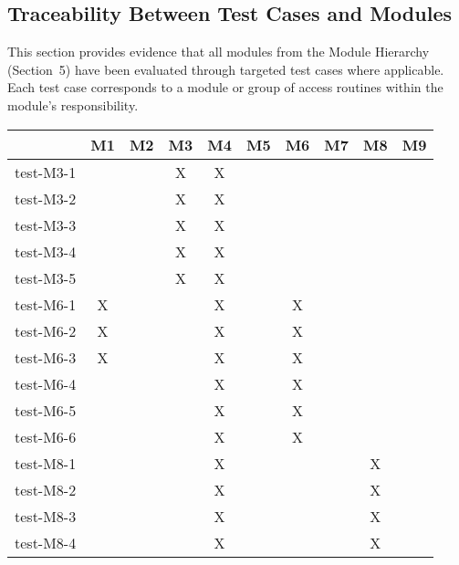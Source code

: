 \documentclass[12pt, titlepage]{article}
\begin{document}
\subsection{Traceability Between Test Cases and Modules}
\label{sec:trace-test-modules}

This section provides evidence that all modules from the Module Hierarchy (Section~5) have been evaluated through targeted test cases where applicable. Each test case corresponds to a module or group of access routines within the module's responsibility.

\begin{table}[h!]
  \centering
  \begin{tabular}{|c|c|c|c|c|c|c|c|c|c|}
  \hline
   & M1 & M2 & M3 & M4 & M5 & M6 & M7 & M8 & M9 \\
  \hline
  test-M3-1   &     &     & X   &  X   &     &     &     &     &     \\ \hline
  test-M3-2   &     &     & X   &  X   &     &     &     &     &     \\ \hline
  test-M3-3   &     &     & X   &  X   &     &     &     &     &     \\ \hline
  test-M3-4   &     &     & X   &  X   &     &     &     &     &     \\ \hline
  test-M3-5   &     &     & X   &  X   &     &     &     &     &     \\ \hline
  test-M6-1   &  X   &     &     &  X   &     & X   &     &     &     \\ \hline
  test-M6-2   &  X   &     &     &  X   &     & X   &     &     &     \\ \hline
  test-M6-3   &  X   &     &     &  X   &     & X   &     &     &     \\ \hline
  test-M6-4   &     &     &     &  X   &     & X   &     &     &     \\ \hline
  test-M6-5   &     &     &     &  X   &     & X   &     &     &     \\ \hline
  test-M6-6   &     &     &     &  X   &     & X   &     &     &     \\ \hline
  test-M8-1   &     &     &     &  X   &     &     &     & X   &     \\ \hline
  test-M8-2   &     &     &     &  X   &     &     &     & X   &     \\ \hline
  test-M8-3   &     &     &     &  X   &     &     &     & X   &     \\ \hline
  test-M8-4   &     &     &     &  X   &     &     &     & X   &     \\ \hline

\end{tabular}
\end{table}
\end{document}
